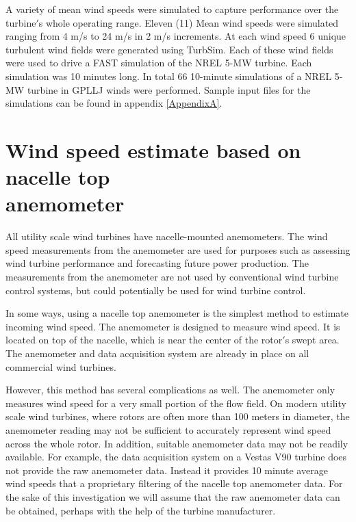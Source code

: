 A variety of mean wind speeds were simulated to capture performance over the turbine$'$s whole operating range. Eleven (11) Mean wind speeds were simulated ranging from 4 m/s to 24 m/s in 2 m/s increments. At each wind speed 6 unique turbulent wind fields were generated using TurbSim. Each of these wind fields were used to drive a FAST simulation of the NREL 5-MW turbine. Each simulation was 10 minutes long. In total 66 10-minute simulations of a NREL 5-MW turbine in GPLLJ winds were performed.  Sample input files for the simulations can be found in appendix \ref{AppendixA}.






\section{Wind speed estimate based on nacelle top \\
anemometer}

All utility scale wind turbines have nacelle-mounted anemometers. The wind speed measurements from the anemometer are used for purposes such as assessing wind turbine performance and forecasting future power production. The measurements from the anemometer are not used by conventional wind turbine control systems, but could potentially be used for wind turbine control.

In some ways, using a nacelle top anemometer is the simplest method to estimate incoming wind speed. The anemometer is designed to measure wind speed. It is located on top of the nacelle, which is near the center of the rotor$'$s swept area. The anemometer and data acquisition system are already in place on all commercial wind turbines. 

However, this method has several complications as well. The anemometer only measures wind speed for a very small portion of the flow field. On modern utility scale wind turbines, where rotors are often more than 100 meters in diameter, the anemometer reading may not be sufficient to accurately represent wind speed across the whole rotor. In addition, suitable anemometer data may not be readily available. For example, the data acquisition system on a Vestas V90 turbine does not provide the raw anemometer data. Instead it provides 10 minute average wind speeds that a proprietary filtering of the nacelle top anemometer data. For the sake of this investigation we will assume that the raw anemometer data can be obtained, perhaps with the help of the turbine manufacturer.


